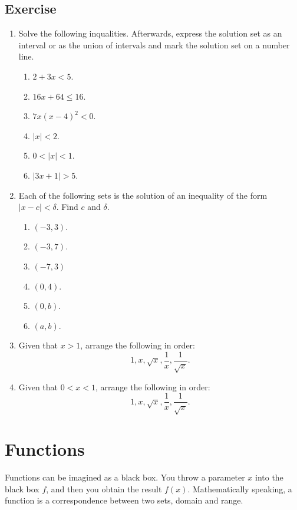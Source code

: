 \documentclass[11pt]{book}
\begin{document}
\subsection*{Exercise}
\begin{enumerate}[label=\arabic*.]
    \item Solve the following inqualities. Afterwards, express the solution set as an interval or as the union of intervals and mark the solution set on a number line.
    \begin{multicols}{3}
        \begin{enumerate}
            \item $2+3x<5$.
            \item $16x+64\leq16$.
            \item $7x(x-4)^2<0$.
            \item $|x|<2$.
            \item $0<|x|<1$.
            \item $|3x+1|>5$.
        \end{enumerate}
    \end{multicols}
    \item Each of the following sets is the solution of an inequality of the form $|x-c|<\delta$. Find $c$ and $\delta$.
    \begin{multicols}{3}
        \begin{enumerate}
            \item $(-3, 3)$.
            \item $(-3, 7)$.
            \item $(-7, 3)$
            \item $(0, 4)$.
            \item $(0, b)$.
            \item $(a, b)$.
        \end{enumerate}
    \end{multicols}
    \item Given that $x>1$, arrange the following in order: $$1, x, \sqrt{x}, \dfrac{1}{x}, \dfrac{1}{\sqrt{x}}.$$
    \item Given that $0<x<1$, arrange the following in order: $$1, x, \sqrt{x}, \dfrac{1}{x}, \dfrac{1}{\sqrt{x}}.$$
\end{enumerate}

\section{Functions}

Functions can be imagined as a black box. You throw a parameter $x$ into the black box $f$, and then you obtain the result $f(x)$. Mathematically speaking, a function is a correspondence between two sets, domain and range.
\end{document}
